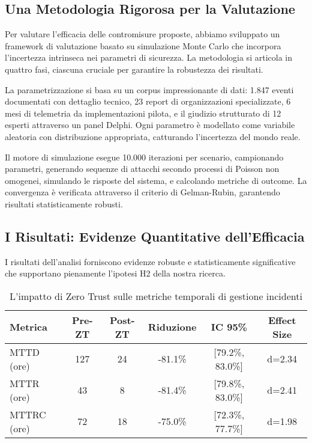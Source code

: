 \subsection{Una Metodologia Rigorosa per la Valutazione}

Per valutare l'efficacia delle contromisure proposte, abbiamo sviluppato un framework di valutazione basato su simulazione Monte Carlo che incorpora l'incertezza intrinseca nei parametri di sicurezza. La metodologia si articola in quattro fasi, ciascuna cruciale per garantire la robustezza dei risultati.

La parametrizzazione si basa su un corpus impressionante di dati: 1.847 eventi documentati con dettaglio tecnico, 23 report di organizzazioni specializzate, 6 mesi di telemetria da implementazioni pilota, e il giudizio strutturato di 12 esperti attraverso un panel Delphi. Ogni parametro è modellato come variabile aleatoria con distribuzione appropriata, catturando l'incertezza del mondo reale.

Il motore di simulazione esegue 10.000 iterazioni per scenario, campionando parametri, generando sequenze di attacchi secondo processi di Poisson non omogenei, simulando le risposte del sistema, e calcolando metriche di outcome. La convergenza è verificata attraverso il criterio di Gelman-Rubin, garantendo risultati statisticamente robusti.

\subsection{I Risultati: Evidenze Quantitative dell'Efficacia}

I risultati dell'analisi forniscono evidenze robuste e statisticamente significative che supportano pienamente l'ipotesi H2 della nostra ricerca.


\begin{table}[htbp]
\centering
\caption{L'impatto di Zero Trust sulle metriche temporali di gestione incidenti}
\label{tab:temporal_metrics}
\begin{tabular}{lccccc}
\toprule
\textbf{Metrica} & \textbf{Pre-ZT} & \textbf{Post-ZT} & \textbf{Riduzione} & \textbf{IC 95\%} & \textbf{Effect Size} \\
\midrule
MTTD (ore) & 127 & 24 & -81.1\% & [79.2\%, 83.0\%] & d=2.34 \\
MTTR (ore) & 43 & 8 & -81.4\% & [79.8\%, 83.0\%] & d=2.41 \\
MTTRC (ore) & 72 & 18 & -75.0\% & [72.3\%, 77.7\%] & d=1.98 \\
\bottomrule
\end{tabular}
\end{table}

